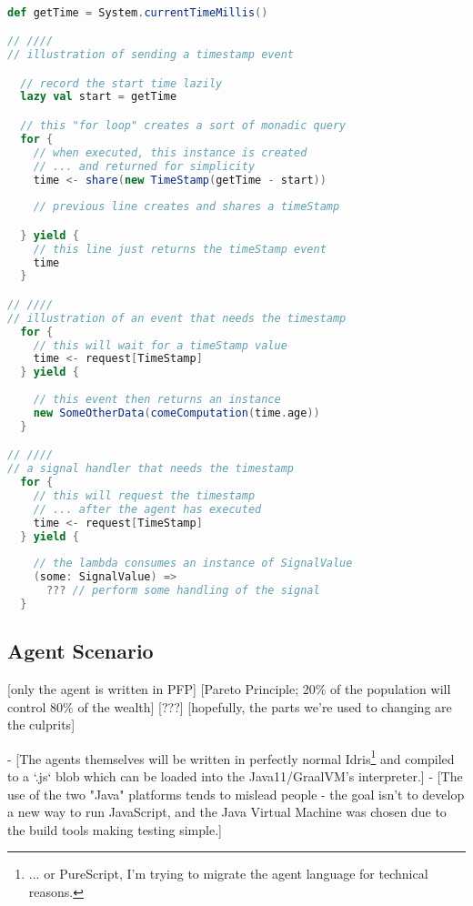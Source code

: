 \begin{lstlisting}[caption={Scala for-yield to interact with the agent}, label={lst:depa},basicstyle=\small,language=Scala]

def getTime = System.currentTimeMillis()

// ////
// illustration of sending a timestamp event

  // record the start time lazily
  lazy val start = getTime

  // this "for loop" creates a sort of monadic query
  for {
    // when executed, this instance is created
    // ... and returned for simplicity
    time <- share(new TimeStamp(getTime - start))
    
    // previous line creates and shares a timeStamp

  } yield {
    // this line just returns the timeStamp event
    time
  }

// ////
// illustration of an event that needs the timestamp
  for {
    // this will wait for a timeStamp value
    time <- request[TimeStamp]
  } yield {
    
    // this event then returns an instance
    new SomeOtherData(comeComputation(time.age))
  }

// ////
// a signal handler that needs the timestamp
  for {
    // this will request the timestamp
    // ... after the agent has executed
    time <- request[TimeStamp]
  } yield {
    
    // the lambda consumes an instance of SignalValue
    (some: SignalValue) =>
      ??? // perform some handling of the signal
  }

\end{lstlisting}



\subsection{Agent Scenario}

[only the agent is written in PFP]
    [Pareto Principle; 20\% of the population will control 80\% of the wealth]
    [???]
    [hopefully, the parts we're used to changing are the culprits]

- [The agents themselves will be written in perfectly normal Idris\footnote{... or PureScript, I'm trying to migrate the agent language for technical reasons.} and compiled to a `.js` blob which can be loaded into the Java11/GraalVM's interpreter.]
    - [The use of the two "Java" platforms tends to mislead people - the goal isn't to develop a new way to run JavaScript, and the Java Virtual Machine was chosen due to the build tools making testing simple.]


